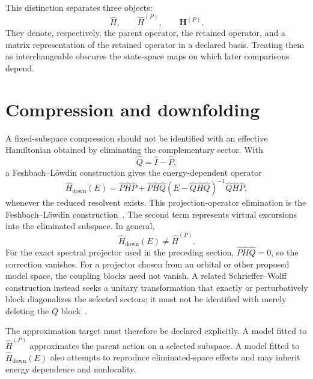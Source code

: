 This distinction separates three objects:
\begin{equation}
    \hat H,
    \qquad
    \hat H^{(P)},
    \qquad
    \mathbf H^{(P)}.
\end{equation}
They denote, respectively, the parent operator, the retained operator, and a
matrix representation of the retained operator in a declared basis. Treating
them as interchangeable obscures the state-space maps on which later
comparisons depend.

\section{Compression and downfolding}


A fixed-subspace compression should not be identified with an effective
Hamiltonian obtained by eliminating the complementary sector. With
\begin{equation}
    \hat Q=\hat I-\hat P,
\end{equation}
a Feshbach--L\"owdin construction gives the energy-dependent operator
\begin{equation}
    \hat H_{\mathrm{down}}(E)
    =
    \hat P\hat H\hat P
    +
    \hat P\hat H\hat Q
    \left(E-\hat Q\hat H\hat Q\right)^{-1}
    \hat Q\hat H\hat P,
\end{equation}
whenever the reduced resolvent exists. This projection-operator elimination is
the Feshbach--L\"owdin construction~\cite{feshbach1958,lowdin1962,lowdin1982}.
The second term represents virtual excursions into the eliminated subspace. In
general,
\begin{equation}
    \hat H_{\mathrm{down}}(E)
    \neq
    \hat H^{(P)}.
\end{equation}
For the exact spectral projector used in the preceding section,
$\hat P\hat H\hat Q=0$, so the correction vanishes. For a projector chosen from
an orbital or other proposed model space, the coupling blocks need not vanish.
A related Schrieffer--Wolff construction instead seeks a unitary transformation
that exactly or perturbatively block diagonalizes the selected sectors; it must
not be identified with merely deleting the $Q$ block~\cite{bravyi2011}.

The approximation target must therefore be declared explicitly. A model
fitted to $\hat H^{(P)}$ approximates the parent action on a selected subspace.
A model fitted to $\hat H_{\mathrm{down}}(E)$ also attempts to reproduce
eliminated-space effects and may inherit energy dependence and nonlocality.

